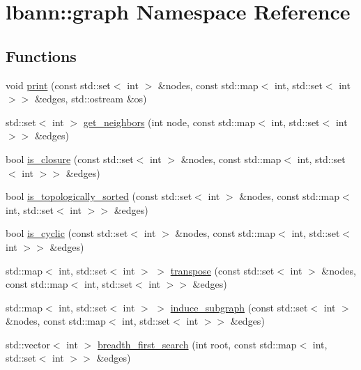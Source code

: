 \hypertarget{namespacelbann_1_1graph}{}\section{lbann\+:\+:graph Namespace Reference}
\label{namespacelbann_1_1graph}
\subsection*{Functions}
\begin{DoxyCompactItemize}
\item 
void \hyperlink{namespacelbann_1_1graph_a956e9f6f1b842a2ffe5bda9015bbb906}{print} (const std\+::set$<$ int $>$ \&nodes, const std\+::map$<$ int, std\+::set$<$ int $>$$>$ \&edges, std\+::ostream \&os)
\item 
std\+::set$<$ int $>$ \hyperlink{namespacelbann_1_1graph_ad305e0d104d25d9cb1e63a4b93c0847c}{get\+\_\+neighbors} (int node, const std\+::map$<$ int, std\+::set$<$ int $>$$>$ \&edges)
\item 
bool \hyperlink{namespacelbann_1_1graph_ac9c1819b38f8bc514ab24ac8778f840b}{is\+\_\+closure} (const std\+::set$<$ int $>$ \&nodes, const std\+::map$<$ int, std\+::set$<$ int $>$$>$ \&edges)
\item 
bool \hyperlink{namespacelbann_1_1graph_a0dd9dcef8bc13481677692347530e328}{is\+\_\+topologically\+\_\+sorted} (const std\+::set$<$ int $>$ \&nodes, const std\+::map$<$ int, std\+::set$<$ int $>$$>$ \&edges)
\item 
bool \hyperlink{namespacelbann_1_1graph_a7cb66f3455c79ca9c959bcf2c36a92eb}{is\+\_\+cyclic} (const std\+::set$<$ int $>$ \&nodes, const std\+::map$<$ int, std\+::set$<$ int $>$$>$ \&edges)
\item 
std\+::map$<$ int, std\+::set$<$ int $>$ $>$ \hyperlink{namespacelbann_1_1graph_a53b0b97c3fc0b88f2fffd44f1b951c71}{transpose} (const std\+::set$<$ int $>$ \&nodes, const std\+::map$<$ int, std\+::set$<$ int $>$$>$ \&edges)
\item 
std\+::map$<$ int, std\+::set$<$ int $>$ $>$ \hyperlink{namespacelbann_1_1graph_a54de9f8e26046c834acfc5436a93b66b}{induce\+\_\+subgraph} (const std\+::set$<$ int $>$ \&nodes, const std\+::map$<$ int, std\+::set$<$ int $>$$>$ \&edges)
\item 
std\+::vector$<$ int $>$ \hyperlink{namespacelbann_1_1graph_a6cc9ff6e6b9707deaa1c77c3b8eb0b20}{breadth\+\_\+first\+\_\+search} (int root, const std\+::map$<$ int, std\+::set$<$ int $>$$>$ \&edges)
\item 

\end{DoxyCompactItemize}
